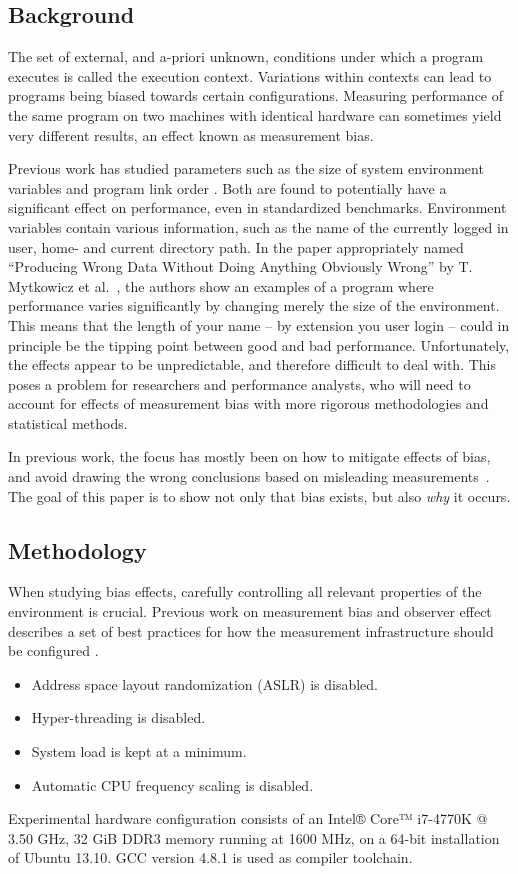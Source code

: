 \documentclass[a4paper,10pt,twocolumn,twoside]{article}
\begin{document}
\subsection{Background}
The set of external, and a-priori unknown, conditions under which a program executes is called the execution context. 
Variations within contexts can lead to programs being biased towards certain configurations. 
Measuring performance of the same program on two machines with identical hardware can sometimes yield very different results, an effect known as measurement bias.

Previous work has studied parameters such as the size of system environment variables and program link order \cite{Mytkowicz:2008:OE&MB}. 
Both are found to potentially have a significant effect on performance, even in standardized benchmarks. 
Environment variables contain various information, such as the name of the currently logged in user, home- and current directory path.
In the paper appropriately named ``Producing Wrong Data Without Doing Anything Obviously Wrong'' by T. Mytkowicz et al.~\cite{Mytkowicz:2009:WrongData}, the authors show an examples of a program where performance varies significantly by changing merely the size of the environment. 
This means that the length of your name -- by extension you user login -- could in principle be the tipping point between good and bad performance.
Unfortunately, the effects appear to be unpredictable, and therefore difficult to deal with. 
This poses a problem for researchers and performance analysts, who will need to account for effects of measurement bias with more rigorous methodologies and statistical methods.

In previous work, the focus has mostly been on how to mitigate effects of bias, and avoid drawing the wrong conclusions based on misleading measurements~\cite{Mytkowicz:2008:Easy, Mytkowicz:2009:WrongData}.
The goal of this paper is to show not only that bias exists, but also \emph{why} it occurs. 


\subsection{Methodology}
When studying bias effects, carefully controlling all relevant properties of the environment is crucial. 
Previous work on measurement bias and observer effect describes a set of best practices for how the measurement infrastructure should be configured \cite{Mytkowicz:2009:WrongData, Mytkowicz:2008:OE&MB}. 
\begin{itemize}
  \item Address space layout randomization (ASLR) is disabled.
  \item Hyper-threading is disabled.
  \item System load is kept at a minimum.
  \item Automatic CPU frequency scaling is disabled.
\end{itemize}
Experimental hardware configuration consists of an Intel® Core™ i7-4770K @ 3.50 GHz, 32 GiB DDR3 memory running at 1600 MHz, on a 64-bit installation of Ubuntu 13.10. GCC version 4.8.1 is used as compiler toolchain.
\end{document}
